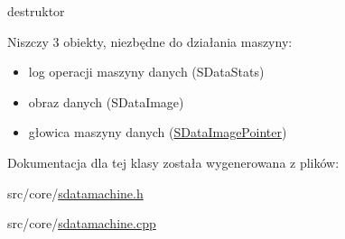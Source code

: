 destruktor 

Niszczy 3 obiekty, niezbędne do działania maszyny:\begin{itemize}
\item log operacji maszyny danych (SDataStats)\item obraz danych (SDataImage)\item głowica maszyny danych (\hyperlink{classSDataImagePointer}{SDataImagePointer}) \end{itemize}


Dokumentacja dla tej klasy została wygenerowana z plików:\begin{CompactItemize}
\item 
src/core/\hyperlink{sdatamachine_8h}{sdatamachine.h}\item 
src/core/\hyperlink{sdatamachine_8cpp}{sdatamachine.cpp}\end{CompactItemize}
